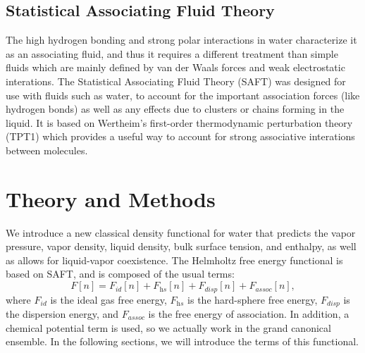 \documentclass[letterpaper,twocolumn,amsmath,amssymb,prb]{revtex4-1}
\begin{document}
\subsection{Statistical Associating Fluid Theory}

The high hydrogen bonding and strong polar interactions in water characterize it
as an associating fluid, and thus it requires a different treatment than simple
fluids which are mainly defined by van der Waals forces and weak electrostatic
interations. The Statistical Associating Fluid Theory (SAFT) was designed for
use with fluids such as water, to account for the important association forces
(like hydrogen bonds) as well as any effects due to clusters or chains forming
in the liquid\cite{muller2001molecular}. It is based on Wertheim's first-order
thermodynamic perturbation theory (TPT1)
\cite{wertheim1984fluidsI,wertheim1984fluidsII,wertheim1986fluidsIII,
wertheim1986fluidsIV} which provides a useful way to account for strong
associative interations between molecules.

\section{Theory and Methods}
We introduce a new classical density functional for water that
predicts the vapor pressure, vapor density, liquid density, bulk surface tension, 
and enthalpy, as well 
as allows for liquid-vapor coexistence.  The Helmholtz free energy functional is
based on SAFT, and is composed of the usual terms:
\begin{equation}
  F[n] = F_\textit{id}[n] + F_\textit{hs}[n]  +
F_\textit{disp}[n]+ F_\textit{assoc}[n],
\end{equation}
where $F_\textit{id}$ is the ideal gas free energy, $F_\textit{hs}$ is
the hard-sphere free energy, $F_\textit{disp}$ is the dispersion energy,
and $F_\textit{assoc}$ is the free energy of association.  In
addition, a chemical potential term is used, so we actually work in
the grand canonical ensemble.  In the following sections, we will
introduce the terms of this functional.
\end{document}
